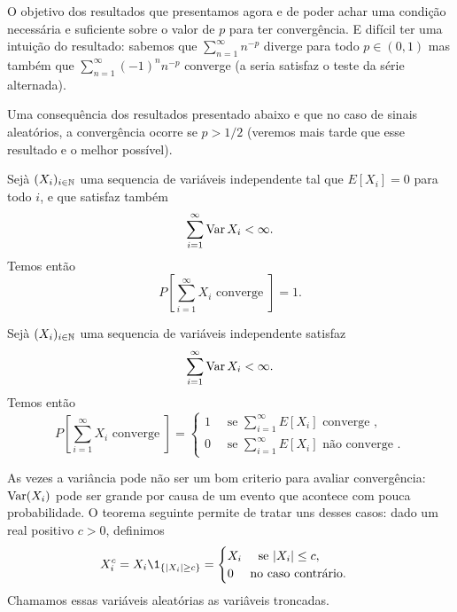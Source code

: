 \begin{topics}
\medskip

O objetivo dos resultados que presentamos agora e de poder achar uma condição necessária e suficiente sobre o valor de $p$ para ter convergência.
E difícil ter uma intuição do resultado: sabemos que  $\sum_{n=1}^{\infty} n^{-p}$ diverge para todo $p\in (0,1)$ mas também que
$\sum_{n=1}^{\infty}(-1)^n n^{-p}$ converge (a seria satisfaz o teste da série alternada).

\medskip

Uma consequência dos resultados presentado abaixo e que no caso de sinais aleatórios, a convergência ocorre se $p>1/2$
(veremos mais tarde que esse resultado e o melhor possível).




\begin{theorem}
 Sejà $(X_i)_{i\in {\ensuremath{\mathbb N}}}$ uma sequencia de variáveis independente tal que $E[X_i]=0$ para todo $i$,
 e que satisfaz também
 $$ \sum_{i=1}^\infty \operatorname{Var} X_i<\infty.$$
Temos então
\begin{equation}
P\left[\sum_{i=1}^{\infty} X_i \text{ converge } \right]=1.
\end{equation}
\end{theorem}

\medskip

\begin{theorem}
 Sejà $(X_i)_{i\in {\ensuremath{\mathbb N}}}$ uma sequencia de variáveis independente
satisfaz
 $$ \sum_{i=1}^\infty \operatorname{Var} X_i<\infty.$$
Temos então
\begin{equation}
P[\sum_{i=1}^{\infty} X_i \text{ converge } ]=\begin{cases} 1 \quad \text{ se } \sum_{i=1}^\infty E[X_i] \text{ converge },\\
                                                0   \quad \text{ se } \sum_{i=1}^\infty E[X_i] \text{ não converge }.
                                              \end{cases}
\end{equation}
\end{theorem}

As vezes a variância pode não ser um bom criterio para avaliar convergência: $\operatorname{Var}(X_i)$ pode ser grande por causa de um evento que
acontece com pouca probabilidade. O teorema seguinte permite de tratar uns desses casos:
dado um real positivo $c>0$, definimos
\begin{equation}
X_i^c= X_i \1_{\{|X_i| \ge c\}}= \begin{cases} X_i \quad \text{ se } |X_i|\le c,\\
                                    0 \quad \text{ no caso contrário.}
                                   \end{cases}
           \end{equation}
Chamamos essas variáveis aleatórias as variâveis troncadas.


\end{topics}
